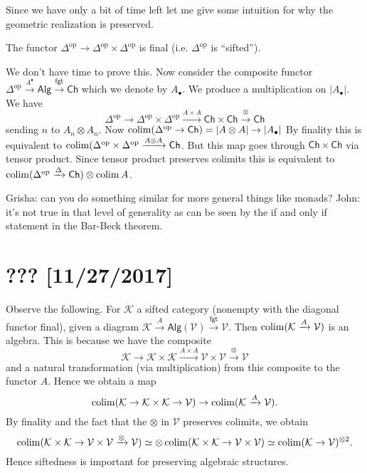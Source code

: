 \documentclass{amsart}
\begin{document}
Since we have only a bit of time left let me give some intuition for why the geometric
realization is preserved.
\begin{lemma}
    The functor $\Delta^\text{op}\to\Delta^\text{op}\times\Delta^\text{op}$ is final (i.e.
    $\Delta^\text{op}$ is ``sifted'').
\end{lemma}
We don't have time to prove this. Now consider the composite functor $\Delta^\text{op}\xrightarrow{A^\bullet}\mathsf{Alg}\xrightarrow{\mathsf{fgt}}\mathsf{Ch}$
which we denote by $A_\bullet$. We produce a multiplication on $|A_\bullet|$. We have
\begin{equation*}
    \Delta^\text{op}\to\Delta^{\text{op}}\times\Delta^\text{op}\xrightarrow{A\times A}\mathsf{Ch}\times\mathsf{Ch}\xrightarrow{\otimes}\mathsf{Ch}
\end{equation*}
sending $n$ to $A_n\otimes A_n$. Now $\operatorname*{colim}(\Delta^\text{op}\to\mathsf{Ch})=|A\otimes A|\to |A_\bullet|$
By finality this is equivalent to $\operatorname*{colim}(\Delta^\text{op}\times\Delta^\text{op}\xrightarrow{A\otimes A}\mathsf{Ch}$.
But this map goes through $\mathsf{Ch}\times\mathsf{Ch}$ via tensor product. Since tensor product preserves
colimits this is equivalent to $\operatorname*{colim}(\Delta^\text{op}\xrightarrow{\Delta}\mathsf{Ch})\otimes\operatorname*{colim} A$.

Grisha: can you do something similar for more general things like monads?
John: it's not true in that level of generality as can be seen by the if and only
if statement in the Bar-Beck theorem.

\newpage

\section{??? [11/27/2017]}

Observe the following. For $\mathcal{K}$ a sifted category (nonempty with the diagonal functor final),
given a diagram $\mathcal{K}\xrightarrow{A}\mathsf{Alg}(\mathcal{V})\xrightarrow{\mathsf{fgt}}\mathcal{V}$.
Then $\operatorname*{colim}(\mathcal{K}\xrightarrow{A}\mathcal{V})$ is an algebra. This is because we have the composite
\begin{equation*}
    \mathcal{K}\to \mathcal{K}\times\mathcal{K}\xrightarrow{A\times A}\mathcal{V}\times\mathcal{V}\xrightarrow{\otimes}\mathcal{V}
\end{equation*}
and a natural transformation (via multiplication) from this composite to the functor $A$. Hence we obtain
a map
\begin{equation*}
    \operatorname*{colim}(\mathcal{K}\to\mathcal{K}\times\mathcal{K}\to \mathcal{V}) \to \operatorname*{colim}(\mathcal{K}\xrightarrow{A}\mathcal{V}).
\end{equation*}
By finality and the fact that the $\otimes$ in $\mathcal{V}$ preserves colimits, we obtain
\begin{equation*}
    \operatorname*{colim}(\mathcal{K}\times\mathcal{K}\to \mathcal{V}\times \mathcal{V}\xrightarrow{\otimes}\mathcal{V}) \simeq \otimes \operatorname*{colim}(\mathcal{K}\times\mathcal{K}\to \mathcal{V}\times\mathcal{V})\simeq \operatorname*{colim}(\mathcal{K}\to \mathcal{V})^{\otimes 2}.
\end{equation*}
Hence siftedness is important for preserving algebraic structures.
\end{document}
